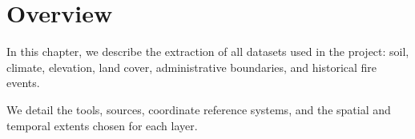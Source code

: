 
\section{Overview}

In this chapter, we describe the extraction of all datasets used in the project:
soil, climate, elevation, land cover, administrative boundaries, and historical
fire events.

We detail the tools, sources, coordinate reference systems, and the spatial and
temporal extents chosen for each layer.






